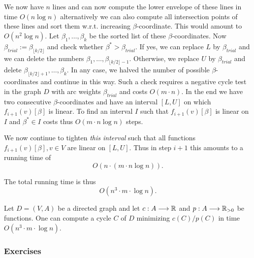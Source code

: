 We now have $n$ lines and can now compute the lower envelope of these
lines in time $O(n \log n)$ alternatively we can also compute all
intersection points of these lines and sort them w.r.t. increasing
$\beta$-coordinate. This would amount to $O(n^2 \log n)$.
Let $\beta_1,\ldots,\beta_k$ be the sorted list of  these  $\beta$-coordinates.
Now  $\beta_{trial}:= \beta_{\lfloor k/2\rfloor}$ and
check whether $\beta^*>\beta_{trial}$. If yes, we can replace $L$ by
$\beta_{trial}$ and we can delete the numbers
$\beta_1,\ldots,\beta_{\lfloor k/2\rfloor-1}$. Otherwise, we replace $U$ by $\beta_{trial}$ and
delete $\beta_{\lfloor k/2\rfloor+1},\ldots,\beta_k$. In
any case, 
we halved the number of possible $\beta$-coordinates and continue in this
way.  Such a check requires a negative cycle test in the graph
$D$ with arc weights $\beta_{trial}$ and costs $O(m \cdot n)$. In the end we have two consecutive $\beta$-coordinates and have an
interval $[L,U]$ on which  $f_{i+1}(v)[\beta]$ is linear.  To  find
an interval $I$ such that $f_{i+1}(v)[\beta]$ is linear on $I$ and $\beta^*
\in I$ costs thus $O(m \cdot n \log n)$ steps. 


We now continue to tighten \emph{this interval} such that all functions
$f_{i+1}(v)[\beta], v \in V$ are linear on $[L,U]$.  Thus in step $i+1$ this
amounts to a running time of 
\begin{displaymath}
  O\left(n \cdot ( m \cdot n \log n) \right). 
\end{displaymath}

The total running time  is thus 
\begin{displaymath}
  O(n^3 \cdot m \cdot \log n).  
\end{displaymath}

\begin{theorem}
  \label{f:thr:2}
  Let $D=(V,A)$ be a directed graph and let $c: A \longrightarrow\mathbb{R}$ and
  $p:A\longrightarrow\mathbb{R}_{>0}$ be functions. One can compute a cycle $C$ of $D$
  minimizing $c(C)/p(C)$ in time  $O(n^3 \cdot m \cdot \log n)$.  
\end{theorem}




\subsubsection{Exercises}

